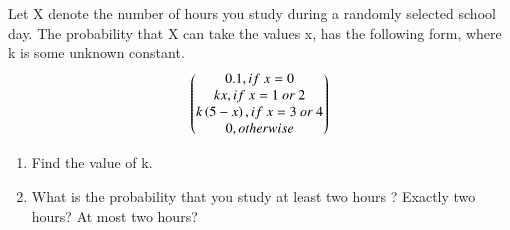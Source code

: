 \begin{flushleft}
Let X denote the number of hours you study during a randomly selected school day. The
probability that X can take the values x, has the following form, where k is some unknown constant.
\begin{align}
\begin{pmatrix}
0.1, if \  x =  0  \\ 
kx, if \  x = 1 \  or \  2 \\
k\left(5-x\right), if \  x = 3\  or \ 4 \\ 
0, otherwise
\end{pmatrix}
\end{align}
\begin{enumerate}
\item Find the value of k.
\item What is the probability that you study at least two hours ? Exactly two hours? At most
two hours?
\end{enumerate}
\end{flushleft}